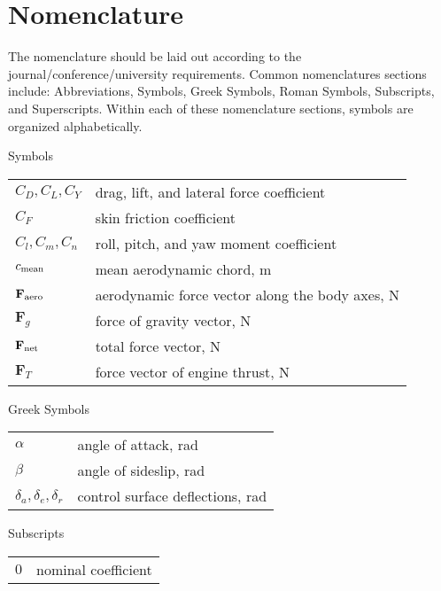 \section{Nomenclature}

The nomenclature should be laid out according to the journal/conference/university requirements. 
Common nomenclatures sections include: Abbreviations, Symbols, Greek Symbols, Roman Symbols, Subscripts, and Superscripts. 
Within each of these nomenclature sections, symbols are organized alphabetically. \\

{\renewcommand\arraystretch{1.0}
\noindent 
Symbols
	\noindent\begin{longtable*}{@{}l @{\quad=\quad} l@{}}
		$C_{D}, C_{L}, C_{Y}$ & drag, lift, and lateral force coefficient \\
		$C_{F}$ & skin friction coefficient \\
		$C_{l}, C_{m}, C_{n}$ & roll, pitch, and yaw moment coefficient \\
		$c_{\textup{mean}}$ & mean aerodynamic chord, m \\
		$\textbf{F}_{\textup{aero}}$ & aerodynamic force vector along the body axes, N\\
		$\textbf{F}_{g}$ & force of gravity vector, N \\
		$\textbf{F}_{\textup{net}}$ & total force vector, N\\
		$\textbf{F}_{T}$ & force vector of engine thrust, N
\end{longtable*}
\noindent
Greek Symbols
\noindent\begin{longtable*}{@{}l @{\quad=\quad} l@{}}
	$\alpha$ & angle of attack, rad \\
	$\beta$ & angle of sideslip, rad \\
	$\delta_{a}, \delta_{e}, \delta_{r}$ & control surface deflections, rad
\end{longtable*}}
\noindent
Subscripts
{\renewcommand\arraystretch{1.0}
	\noindent\begin{longtable*}{@{}l @{\quad=\quad} l@{}}
		$0$ & nominal coefficient 
\end{longtable*}}
\noindent
\begin{comment}
Superscripts
{\renewcommand\arraystretch{1.0}
	\noindent\begin{longtable*}{@{}l @{\quad=\quad} l@{}}
		$\hat{\pbox{1}}$ & normalized variable
\end{longtable*}}
\end{comment}

